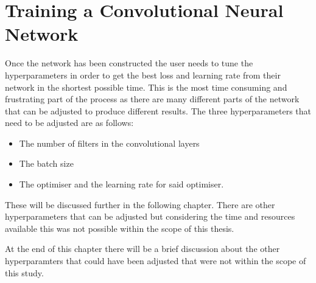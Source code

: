 \chapter{Training a Convolutional Neural Network}
Once the network has been constructed the user needs to tune the hyperparameters in order to get the best loss and learning rate from their network in the shortest possible time. This is the most time consuming and frustrating part of the process as there are many different parts of the network that can be adjusted to produce different results. The three hyperparameters that need to be adjusted are as follows:
\begin{itemize}
    \item The number of filters in the convolutional layers
    \item The batch size
    \item The optimiser and the learning rate for said optimiser.
\end{itemize}
These will be discussed further in the following chapter. There are other hyperparameters that can be adjusted but considering the time and resources available this was not possible within the scope of this thesis. 
\par
At the end of this chapter there will be a brief discussion about the other hyperparamters that could have been adjusted that were not within the scope of this study. 
